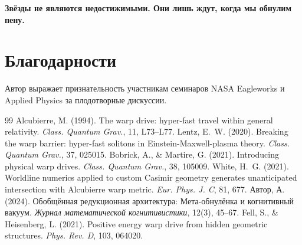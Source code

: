 \documentclass[11pt]{article}
\begin{document}
\textbf{Звёзды не являются недостижимыми. Они лишь ждут, когда мы обнулим пену.}

\section*{Благодарности}
Автор выражает признательность участникам семинаров NASA Eagleworks и Applied Physics за плодотворные дискуссии.

\begin{thebibliography}{99}
 Alcubierre, M. (1994). The warp drive: hyper-fast travel within general relativity. \textit{Class. Quantum Grav.}, 11, L73--L77.
 Lentz, E.~W. (2020). Breaking the warp barrier: hyper-fast solitons in Einstein-Maxwell-plasma theory. \textit{Class. Quantum Grav.}, 37, 025015.
 Bobrick, A., \& Martire, G. (2021). Introducing physical warp drives. \textit{Class. Quantum Grav.}, 38, 105009.
 White, H.~G. (2021). Worldline numerics applied to custom Casimir geometry generates unanticipated intersection with Alcubierre warp metric. \textit{Eur. Phys. J. C}, 81, 677.
 Автор, А. (2024). Обобщённая редукционная архитектура: Мета-обнулёнка и когнитивный вакуум. \textit{Журнал математической когнитивистики}, 12(3), 45--67.
 Fell, S., \& Heisenberg, L. (2021). Positive energy warp drive from hidden geometric structures. \textit{Phys. Rev. D}, 103, 064020.
\end{thebibliography}
\end{document}
